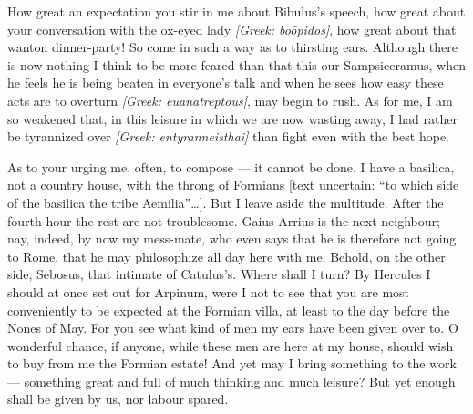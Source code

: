

 How great an expectation you stir in me about Bibulus's speech, how great about your conversation with the ox-eyed lady \textit{[Greek: bo\=opidos]}, how great about that wanton dinner-party! So come in such a way as to thirsting ears. Although there is now nothing I think to be more feared than that this our Sampsiceramus, when he feels he is being beaten in everyone's talk and when he sees how easy these acts are to overturn \textit{[Greek: euanatreptous]}, may begin to rush. As for me, I am so weakened that, in this leisure in which we are now wasting away, I had rather be tyrannized over \textit{[Greek: entyranneisthai]} than fight even with the best hope.

 As to your urging me, often, to compose --- it cannot be done. I have a basilica, not a country house, with the throng of Formians [text uncertain: ``to which side of the basilica the tribe Aemilia''\ldots]. But I leave aside the multitude. After the fourth hour the rest are not troublesome. Gaius Arrius is the next neighbour; nay, indeed, by now my mess-mate, who even says that he is therefore not going to Rome, that he may philosophize all day here with me. Behold, on the other side, Sebosus, that intimate of Catulus's. Where shall I turn? By Hercules I should at once set out for Arpinum, were I not to see that you are most conveniently to be expected at the Formian villa, at least to the day before the Nones of May. For you see what kind of men my ears have been given over to. O wonderful chance, if anyone, while these men are here at my house, should wish to buy from me the Formian estate! And yet may I bring something to the work --- something great and full of much thinking and much leisure? But yet enough shall be given by us, nor labour spared.
